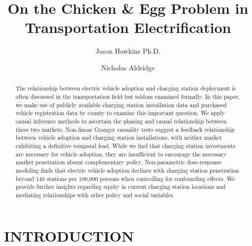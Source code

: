 \documentclass[
  letterpaper,
  DIV=11,
  numbers=noendperiod]{scrartcl}
\title{On the Chicken \& Egg Problem in Transportation Electrification}
\author{Jason Hawkins Ph.D. \and Nicholas Aldridge}
\date{}
\begin{document}
\maketitle
\begin{abstract}
The relationship between electric vehicle adoption and charging station
deployment is often discussed in the transportation field but seldom
examined formally. In this paper, we make use of publicly available
charging station installation data and purchased vehicle registration
data by county to examine this important question. We apply causal
inference methods to ascertain the phasing and causal relationship
between these two markets. Non-linear Granger causality tests suggest a
feedback relationship between vehicle adoption and charging station
installations, with neither market exhibiting a definitive temporal
lead. While we find that charging station investments are necessary for
vehicle adoption, they are insufficient to encourage the necessary
market penetration absent complementary policy. Non-parametric
dose-response modeling finds that electric vehicle adoption declines
with charging station penetration beyond 140 stations per 100,000
persons when controlling for confounding effects. We provide further
insights regarding equity in current charging station locations and
mediating relationships with other policy and social variables.
\end{abstract}
\ifdefined\Shaded\renewenvironment{Shaded}{\begin{tcolorbox}[breakable, enhanced, boxrule=0pt, sharp corners, borderline west={3pt}{0pt}{shadecolor}, frame hidden, interior hidden]}{\end{tcolorbox}}\fi

\hypertarget{introduction}{%
\section{INTRODUCTION}\label{introduction}}
\end{document}
